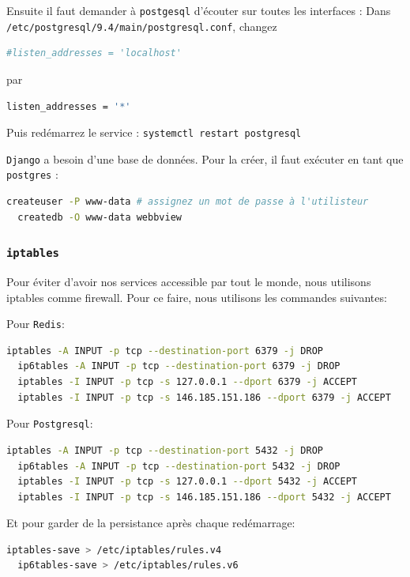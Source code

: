 \documentclass[10pt,a4paper]{article}
\begin{document}
Ensuite il faut demander à \texttt{postgesql} d'écouter sur toutes les interfaces :
Dans \texttt{/etc/postgresql/9.4/main/postgresql.conf}, changez
\begin{lstlisting}[language=bash]
  #listen_addresses = 'localhost'
\end{lstlisting}
par
\begin{lstlisting}[language=bash]
  listen_addresses = '*'
\end{lstlisting}

Puis redémarrez le service : \texttt{systemctl restart postgresql}

\texttt{Django} a besoin d'une base de données.
Pour la créer, il faut exécuter en tant que \texttt{postgres} :
\begin{lstlisting}[language=bash]
  createuser -P www-data # assignez un mot de passe à l'utilisteur
  createdb -O www-data webbview
\end{lstlisting}

\subsubsection{\texttt{iptables}}
Pour éviter d'avoir nos services accessible par tout le monde, nous utilisons iptables comme firewall.
Pour ce faire, nous utilisons les commandes suivantes:


Pour \texttt{Redis}:
\begin{lstlisting}[language=bash]
  iptables -A INPUT -p tcp --destination-port 6379 -j DROP
  ip6tables -A INPUT -p tcp --destination-port 6379 -j DROP
  iptables -I INPUT -p tcp -s 127.0.0.1 --dport 6379 -j ACCEPT
  iptables -I INPUT -p tcp -s 146.185.151.186 --dport 6379 -j ACCEPT
\end{lstlisting}

Pour \texttt{Postgresql}:
\begin{lstlisting}[language=bash]
  iptables -A INPUT -p tcp --destination-port 5432 -j DROP
  ip6tables -A INPUT -p tcp --destination-port 5432 -j DROP
  iptables -I INPUT -p tcp -s 127.0.0.1 --dport 5432 -j ACCEPT
  iptables -I INPUT -p tcp -s 146.185.151.186 --dport 5432 -j ACCEPT
\end{lstlisting}

Et pour garder de la persistance après chaque redémarrage:
\begin{lstlisting}[language=bash]
  iptables-save > /etc/iptables/rules.v4
  ip6tables-save > /etc/iptables/rules.v6
\end{lstlisting}
\end{document}
